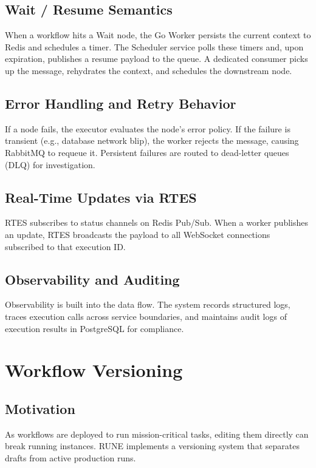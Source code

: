 \documentclass[12pt]{report}
\begin{document}
\section{Wait / Resume Semantics}
When a workflow hits a Wait node, the Go Worker persists the current context to Redis and schedules a timer. The Scheduler service polls these timers and, upon expiration, publishes a resume payload to the  queue. A dedicated consumer picks up the message, rehydrates the context, and schedules the downstream node.

\section{Error Handling and Retry Behavior}
If a node fails, the executor evaluates the node's error policy. If the failure is transient (e.g., database network blip), the worker rejects the message, causing RabbitMQ to requeue it. Persistent failures are routed to dead-letter queues (DLQ) for investigation.

\section{Real-Time Updates via RTES}
RTES subscribes to status channels on Redis Pub/Sub. When a worker publishes an update, RTES broadcasts the payload to all WebSocket connections subscribed to that execution ID.

\section{Observability and Auditing}
Observability is built into the data flow. The system records structured logs, traces execution calls across service boundaries, and maintains audit logs of execution results in PostgreSQL for compliance.

\chapter{Workflow Versioning}
\label{ch:workflow_versioning}

\section{Motivation}
As workflows are deployed to run mission-critical tasks, editing them directly can break running instances. RUNE implements a versioning system that separates drafts from active production runs.
\end{document}
